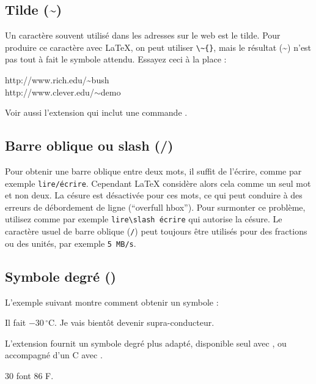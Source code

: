 \subsection{Tilde (\textasciitilde)}
Un caractère souvent utilisé dans les adresses sur le web est le
tilde. Pour produire ce caractère avec \LaTeX{}, on peut utiliser
\verb|\~{}|, mais le résultat (\~{}) n'est pas tout à fait le symbole
attendu. Essayez ceci à la place :

\begin{example}
http://www.rich.edu/\~{}bush \\
http://www.clever.edu/$\sim$demo
\end{example}

Voir aussi l'extension  qui inclut une commande
.

\subsection{Barre oblique ou slash (/)}
Pour obtenir une barre oblique entre deux mots, il suffit de l'écrire,
comme par exemple \texttt{lire/écrire}. Cependant \LaTeX{} considère
alors cela comme un seul mot et non deux. La césure est désactivée
pour ces mots, ce qui peut conduire à des erreurs de débordement de
ligne (\enquote{overfull hbox}). Pour surmonter ce problème, utilisez
 comme par exemple \verb|lire\slash écrire| qui autorise la
césure. Le caractère usuel de barre oblique (\texttt{/}) peut toujours
être utilisés pour des fractions ou des unités, par exemple \texttt{5 MB/s}.

\subsection{Symbole degré (\textdegree)}

L'exemple suivant montre comment obtenir un symbole  :

\begin{example}
Il fait $-30\,^{\circ}\mathrm{C}$.
Je vais bient\^ot devenir
supra-conducteur.
\end{example}

L'extension  fournit un symbole degré plus adapté, disponible
seul avec , ou accompagné d'un C avec
.

\begin{example}
30 \textcelsius{} font
86 \textdegree{}F.
\end{example}

